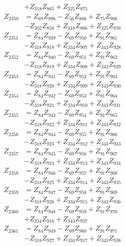 \begin{multicols}{2}
\begin{align}
&+ Z_{318}Z_{865} + Z_{325}Z_{875} \nonumber \\
Z_{2350} &= Z_{69}Z_{896} - Z_{56}Z_{886} + Z_{75}Z_{906}  \nonumber \\
&- Z_{302}Z_{856} + Z_{318}Z_{866} + Z_{325}Z_{876} \nonumber \\
Z_{2351} &= Z_{84}Z_{939} - Z_{69}Z_{950} + Z_{91}Z_{961}  \nonumber \\
&- Z_{318}Z_{918} + Z_{334}Z_{907} + Z_{343}Z_{928} \nonumber \\
Z_{2352} &= Z_{84}Z_{940} - Z_{69}Z_{951} + Z_{91}Z_{962}  \nonumber \\
&- Z_{318}Z_{919} + Z_{334}Z_{908} + Z_{343}Z_{929} \nonumber \\
Z_{2353} &= Z_{84}Z_{941} - Z_{69}Z_{952} + Z_{91}Z_{963}  \nonumber \\
&- Z_{318}Z_{920} + Z_{334}Z_{909} + Z_{343}Z_{930} \nonumber \\
Z_{2354} &= Z_{84}Z_{942} - Z_{69}Z_{953} + Z_{91}Z_{964}  \nonumber \\
&- Z_{318}Z_{921} + Z_{334}Z_{910} + Z_{343}Z_{931} \nonumber \\
Z_{2355} &= Z_{84}Z_{943} - Z_{69}Z_{954} + Z_{91}Z_{965}  \nonumber \\
&- Z_{318}Z_{922} + Z_{334}Z_{911} + Z_{343}Z_{932} \nonumber \\
Z_{2356} &= Z_{84}Z_{944} - Z_{69}Z_{955} + Z_{91}Z_{966}  \nonumber \\
&- Z_{318}Z_{923} + Z_{334}Z_{912} + Z_{343}Z_{933} \nonumber \\
Z_{2357} &= Z_{84}Z_{945} - Z_{69}Z_{956} + Z_{91}Z_{967}  \nonumber \\
&- Z_{318}Z_{924} + Z_{334}Z_{913} + Z_{343}Z_{934} \nonumber \\
Z_{2358} &= Z_{84}Z_{946} - Z_{69}Z_{957} + Z_{91}Z_{968}  \nonumber \\
&- Z_{318}Z_{925} + Z_{334}Z_{914} + Z_{343}Z_{935} \nonumber \\
Z_{2359} &= Z_{84}Z_{947} - Z_{69}Z_{958} + Z_{91}Z_{969}  \nonumber \\
&- Z_{318}Z_{926} + Z_{334}Z_{915} + Z_{343}Z_{936} \nonumber \\
Z_{2360} &= Z_{84}Z_{948} - Z_{69}Z_{959} + Z_{91}Z_{970}  \nonumber \\
&+ Z_{334}Z_{916} + Z_{343}Z_{937} \nonumber \\
Z_{2361} &= Z_{84}Z_{949} - Z_{69}Z_{960} + Z_{91}Z_{971}  \nonumber \\
&- Z_{318}Z_{927} + Z_{334}Z_{917} + Z_{343}Z_{938} \nonumber \\

\end{align}
\end{multicols}
